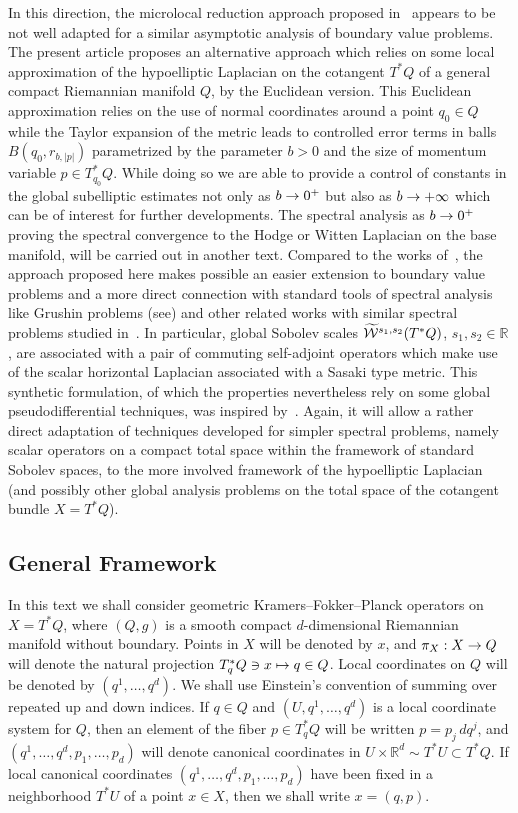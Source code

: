 \documentclass[AHL,Unicode,longabstracts]{cedram}
\newcommand{\R}{\mathbb{R}}
\newcommand{\clW}{\mathcal{W}}
\let\oldtilde\tilde
\renewcommand*{\tilde}[1]{\mathchoice{\widetilde{#1}}{\widetilde{#1}}{\oldtilde{#1}}{\oldtilde{#1}}}
\renewcommand*{\to}{\mathchoice{\longrightarrow}{\rightarrow}{\rightarrow}{\rightarrow}}
\let\oldmapsto\mapsto
\renewcommand*{\mapsto}{\mathchoice{\longmapsto}{\oldmapsto}{\oldmapsto}{\oldmapsto}}
\begin{document}
In this direction, the microlocal reduction approach proposed in~\cite{BiLe,Leb1,Leb2} appears to be not well adapted for a similar asymptotic analysis of boundary value problems. The present article proposes an alternative approach which relies on some local approximation of the hypoelliptic Laplacian on the cotangent $T^{*}Q$ of a general compact Riemannian manifold $Q$, by the Euclidean version. This Euclidean approximation relies on the use of normal coordinates around a point $q_{0}\in Q$ while the Taylor expansion of the metric leads to controlled error terms in balls $B(q_{0},r_{b,|p|})$ parametrized by the parameter $b>0$ and the size of momentum variable $p\in T^{*}_{q_{0}}Q$.
While doing so we are able to provide a control of constants in the global subelliptic estimates not only as $b\to 0^{+}$ but also as $b\to +\infty$ which can be of interest for further developments. The spectral analysis as $b\to 0^{+}$ proving the spectral convergence to the Hodge or Witten Laplacian on the base manifold, will be carried out in another text. Compared to the works of~\cite{BiLe,She}, the approach proposed here makes possible an easier extension to boundary value problems and a more direct connection with standard tools of spectral analysis like Grushin problems (see\cite{SjZw}) and other related works with similar spectral problems studied in~\cite{Dro,ReTa,Smi}. In particular, global Sobolev scales $\tilde{\clW}^{s_{1},s_{2}}(T^{*}Q)$, $s_{1},s_{2}\in
\R$, are associated with a pair of commuting self-adjoint operators which make use of the scalar horizontal Laplacian associated with a Sasaki type metric. This synthetic formulation, of which the properties nevertheless rely on some global pseudodifferential techniques, was inspired by~\cite{BeBo,ReTa}. Again, it will allow a rather direct adaptation of techniques developed for simpler spectral problems, namely scalar operators on a compact total space within the framework of standard Sobolev spaces, to the more involved framework of the hypoelliptic Laplacian (and possibly other global analysis problems on the total space of the cotangent bundle $X=T^{*}Q$).

\subsection{General Framework}

In this text we shall consider geometric Kramers--Fokker--Planck operators on $X = T^* Q$, where $(Q, g)$ is a smooth compact $d$-dimensional Riemannian manifold without boundary. Points in $X$ will be denoted by $x$, and $\pi_{X}: X \to Q$ will denote the natural projection $T^*_q Q \ni x \mapsto q \in Q$. Local coordinates on $Q$ will be denoted by $(q^1, \dots, q^d)$. We shall use Einstein's convention of summing over repeated up and down indices. If $q \in Q$ and $(U, q^1, \dots, q^d)$ is a local coordinate system for $Q$, then an element of the fiber $p \in T^*_q Q$ will be written $p = p_j \, dq^j$, and $(q^1, \dots, q^d, p_1, \dots, p_d)$ will denote canonical coordinates in $U \times \R^d \sim T^* U \subset T^* Q$. If local canonical coordinates $(q^1, \dots, q^d, p_1, \dots, p_d)$ have been fixed in a neighborhood $T^* U$ of a point $x \in X$, then we shall write $x = (q,p)$.
\end{document}
